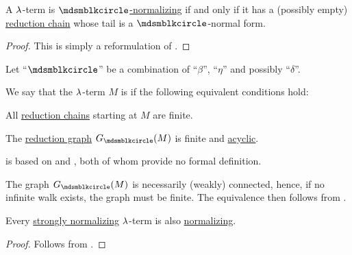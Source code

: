 \begin{proposition}\label{thm:term_normalizing_iff_exists_finite_reduction_chain}
  A \( \mathrm{\lambda} \)-term is \hyperref[def:lambda_reduction_normal_form]{\( \Anon \)-normalizing} if and only if it has a (possibly empty) \hyperref[def:lambda_term_reduction_graph]{reduction chain} whose tail is a \( \Anon \)-normal form.
\end{proposition}
\begin{proof}
  This is simply a reformulation of .
\end{proof}

\begin{definition}\label{def:strongly_normalizing_lambda_term}\mimprovised
  Let \enquote{\( {\Anon} \)} be a combination of \enquote{\( \beta \)}, \enquote{\( \eta \)} and possibly \enquote{\( \delta \)}.

  We say that the \( \mathrm{\lambda} \)-term \( M \) is  if the following equivalent conditions hold:
  \begin{thmenum}
     All \hyperref[def:lambda_term_reduction_graph]{reduction chains} starting at \( M \) are finite.

     The \hyperref[def:lambda_term_reduction_graph]{reduction graph} \( G_{\Anon}(M) \) is finite and \hyperref[def:acyclic_graph]{acyclic}.
  \end{thmenum}
\end{definition}
\begin{comments}
  \item {} is based on  and , both of whom provide no formal definition.
\end{comments}
\begin{defproof}
  The graph \( G_{\Anon}(M) \) is necessarily (weakly) connected, hence, if no infinite walk exists, the graph must be finite. The equivalence then follows from .
\end{defproof}

\begin{proposition}\label{thm:strongly_normalizing_term_is_normalizing}
  Every \hyperref[def:strongly_normalizing_lambda_term]{strongly normalizing} \( \mathrm{\lambda} \)-term is also \hyperref[def:lambda_term_normalization]{normalizing}.
\end{proposition}
\begin{proof}
  Follows from .
\end{proof}

